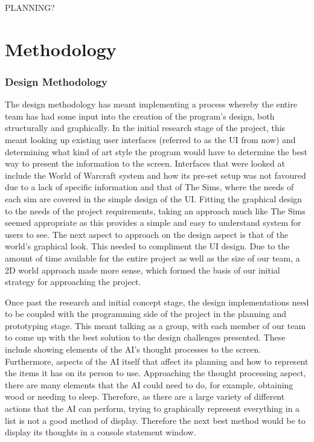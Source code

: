 \documentclass[a4paper]{report}
\begin{document}
PLANNING?


\chapter{Methodology}
\subsection{Design Methodology}
The design methodology has meant implementing a process whereby the entire team has had some input into the creation of the program’s design, both structurally and graphically. In the initial research stage of the project, this meant looking up existing user interfaces (referred to as the UI from now) and determining what kind of art style the program would have to determine the best way to present the information to the screen. Interfaces that were looked at include the World of Warcraft system and how its pre-set setup was not favoured due to a lack of specific information and that of The Sims, where the needs of each sim are covered in the simple design of the UI. Fitting the graphical design to the needs of the project requirements, taking an approach much like The Sims seemed appropriate as this provides a simple and easy to understand system for users to see. The next aspect to approach on the design aspect is that of the world’s graphical look. This needed to compliment the UI design. Due to the amount of time available for the entire project as well as the size of our team, a 2D world approach made more sense, which formed the basis of our initial strategy for approaching the project.

Once past the research and initial concept stage, the design implementations need to be coupled with the programming side of the project in the planning and prototyping stage. This meant talking as a group, with each member of our team to come up with the best solution to the design challenges presented. These include showing elements of the AI’s thought processes to the screen. Furthermore, aspects of the AI itself that affect its planning and how to represent the items it has on its person to use. Approaching the thought processing aspect, there are many elements that the AI could need to do, for example, obtaining wood or needing to sleep. Therefore, as there are a large variety of different actions that the AI can perform, trying to graphically represent everything in a list is not a good method of display. Therefore the next best method would be to display its thoughts in a console statement window.
\end{document}
